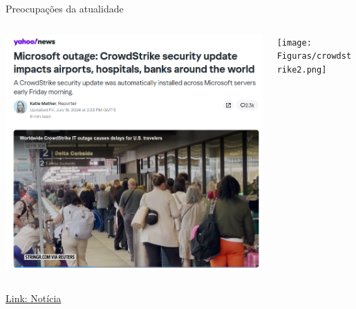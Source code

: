     
\begin{frame}{Preocupações da atualidade}
\centering
\begin{columns}
    \begin{column}{0.48\linewidth}
        \includegraphics[width=\linewidth]{Figuras/crowdstrike1.png}
    \end{column}
    \begin{column}{0.48\linewidth}
        \texttt{[image: Figuras/crowdstrike2.png]}
    \end{column}
\end{columns}
\href{https://www.yahoo.com/news/microsoft-outage-crowdstrike-security-update-impacts-airports-hospitals-banks-around-the-world-151137547.html}{Link: Notícia}
\end{frame}

